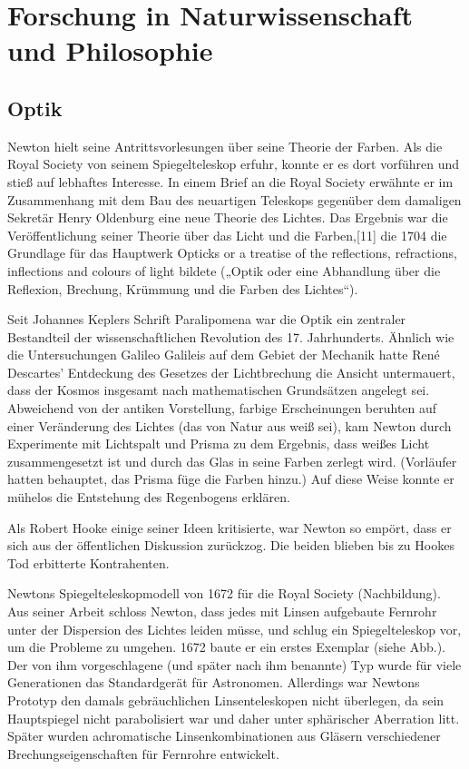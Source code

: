 \section{Forschung in Naturwissenschaft und Philosophie}



\subsection{Optik}
Newton hielt seine Antrittsvorlesungen über seine Theorie der Farben. Als die Royal Society von seinem Spiegelteleskop erfuhr, konnte er es dort vorführen und stieß auf lebhaftes Interesse. In einem Brief an die Royal Society erwähnte er im Zusammenhang mit dem Bau des neuartigen Teleskops gegenüber dem damaligen Sekretär Henry Oldenburg eine neue Theorie des Lichtes. Das Ergebnis war die Veröffentlichung seiner Theorie über das Licht und die Farben,[11] die 1704 die Grundlage für das Hauptwerk Opticks or a treatise of the reflections, refractions, inflections and colours of light bildete („Optik oder eine Abhandlung über die Reflexion, Brechung, Krümmung und die Farben des Lichtes“).

Seit Johannes Keplers Schrift Paralipomena war die Optik ein zentraler Bestandteil der wissenschaftlichen Revolution des 17. Jahrhunderts. Ähnlich wie die Untersuchungen Galileo Galileis auf dem Gebiet der Mechanik hatte René Descartes’ Entdeckung des Gesetzes der Lichtbrechung die Ansicht untermauert, dass der Kosmos insgesamt nach mathematischen Grundsätzen angelegt sei. Abweichend von der antiken Vorstellung, farbige Erscheinungen beruhten auf einer Veränderung des Lichtes (das von Natur aus weiß sei), kam Newton durch Experimente mit Lichtspalt und Prisma zu dem Ergebnis, dass weißes Licht zusammengesetzt ist und durch das Glas in seine Farben zerlegt wird. (Vorläufer hatten behauptet, das Prisma füge die Farben hinzu.) Auf diese Weise konnte er mühelos die Entstehung des Regenbogens erklären.

Als Robert Hooke einige seiner Ideen kritisierte, war Newton so empört, dass er sich aus der öffentlichen Diskussion zurückzog. Die beiden blieben bis zu Hookes Tod erbitterte Kontrahenten.


Newtons Spiegelteleskopmodell von 1672 für die Royal Society (Nachbildung).
Aus seiner Arbeit schloss Newton, dass jedes mit Linsen aufgebaute Fernrohr unter der Dispersion des Lichtes leiden müsse, und schlug ein Spiegelteleskop vor, um die Probleme zu umgehen. 1672 baute er ein erstes Exemplar (siehe Abb.). Der von ihm vorgeschlagene (und später nach ihm benannte) Typ wurde für viele Generationen das Standardgerät für Astronomen. Allerdings war Newtons Prototyp den damals gebräuchlichen Linsenteleskopen nicht überlegen, da sein Hauptspiegel nicht parabolisiert war und daher unter sphärischer Aberration litt. Später wurden achromatische Linsenkombinationen aus Gläsern verschiedener Brechungseigenschaften für Fernrohre entwickelt.

